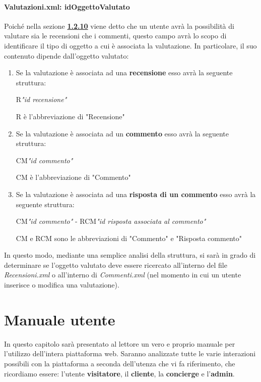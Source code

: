 \documentclass [a4paper, 12pt]{book}
\begin{document}
\subsubsection{Valutazioni.xml: idOggettoValutato}
Poiché nella sezione \hyperref[ValutazioneRecensioni]{\textbf{1.2.10}} viene detto che un utente avrà la possibilità di valutare sia le recensioni che i commenti, questo campo avrà lo scopo di identificare il tipo di oggetto a cui è associata la valutazione. In particolare, il suo contenuto dipende dall'oggetto valutato:
\begin{enumerate}
\item Se la valutazione è associata ad una \textbf{recensione} esso avrà la seguente struttura:
\begin{center}
R\textit{"id recensione"}
\end{center}
R è l'abbreviazione di "Recensione"
\item Se la valutazione è associata ad un \textbf{commento} esso avrà la seguente struttura:
\begin{center}
CM\textit{"id commento"}
\end{center}
CM è l'abbreviazione di "Commento"
\item Se la valutazione è associata ad una \textbf{risposta di un commento} esso avrà la seguente struttura:
\begin{center}
CM\textit{"id commento"} - RCM\textit{"id risposta associata al commento"}
\end{center}
CM e RCM sono le abbreviazioni di "Commento" e "Risposta commento"
\end{enumerate}
In questo modo, mediante una semplice analisi della struttura, si sarà in grado di determinare se l'oggetto valutato deve essere ricercato all'interno del file \textit{Recensioni.xml} o all'interno di \textit{Commenti.xml} (nel momento in cui un utente inserisce o modifica una valutazione).



\chapter{Manuale utente}
In questo capitolo sarà presentato al lettore un vero e proprio manuale per l'utilizzo dell'intera piattaforma web. Saranno analizzate tutte le varie interazioni possibili con la piattaforma a seconda dell'utenza che vi fa riferimento, che ricordiamo essere: l'utente \textbf{visitatore}, il \textbf{cliente}, la \textbf{concierge} e l'\textbf{admin}. 
\end{document}
